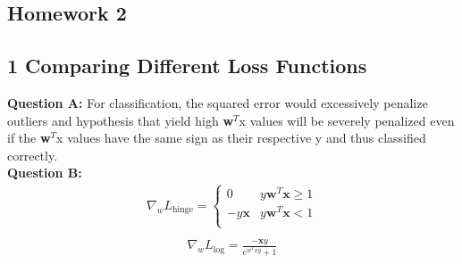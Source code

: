 \documentclass[12 pt]{article}
\begin{document}
	\begin{center}
		\section*{Homework 2}
	\end{center}
	
	
	\subsection*{1 Comparing Different Loss Functions}	
	\noindent\textbf{Question A:} For classification, the squared error would excessively penalize outliers and hypothesis that yield high \textbf{w}$^T$x values will be severely penalized even if the \textbf{w}$^T$x values have the same sign as their respective y and thus classified correctly.\\
	
	\noindent\textbf{Question B:}  \\
	
	\begin{eqnarray*}
		\nabla_w L_{\text{hinge}} = \begin{cases} 
		0 & y\textbf{w}^T\textbf{x} \geq 1 \\
		-y\textbf{x} & y\textbf{w}^T\textbf{x} < 1 \\ 
		\end{cases}\\
		\end{eqnarray*} 
	\begin{eqnarray*}
		\nabla_w L_{\text{log}} = \frac{-\textbf{x}y}{e^{w^{T}xy} + 1}
	\end{eqnarray*}
	
\end{document}

